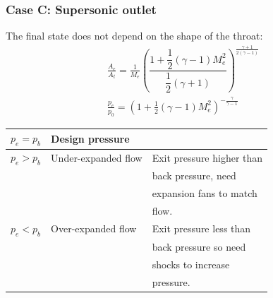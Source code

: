 \documentclass[class=report, crop=false, 12pt,a4paper]{standalone}
\begin{document}
\subsubsection{Case C: Supersonic outlet}
The final state does not depend on the shape of the throat:
\begin{gather}
    \frac{A_e}{A_t} = \frac{1}{M_e}\left(\dfrac{1 + \dfrac{1}{2}\left(\gamma -1\right)M^2_e}{\dfrac{1}{2}\left(\gamma + 1\right)}\right)^{\frac{\gamma + 1}{2\left(\gamma -1\right)}}\\[5pt]
    \frac{p_e}{p_0} = \left(1 + \frac{1}{2}\left(\gamma -1\right)M^2_e\right)^{-\frac{\gamma}{\gamma - 1}}
\end{gather}
\begin{table}[H]
    \centering
    \begin{tabular}{@{}lll@{}}
        \toprule
        $p_e = p_b$ & Design pressure     &                           \\ \midrule
        $p_e > p_b$ & Under-expanded flow & Exit pressure higher than \\
                    &                     & back pressure, need       \\
                    &                     & expansion fans to match   \\ & & flow.                                              \\
        $p_e < p_b$ & Over-expanded flow  & Exit pressure less than   \\
                    &                     & back pressure so need     \\ & & shocks to increase \\ & & pressure. \\ \bottomrule
    \end{tabular}
\end{table}
\end{document}
